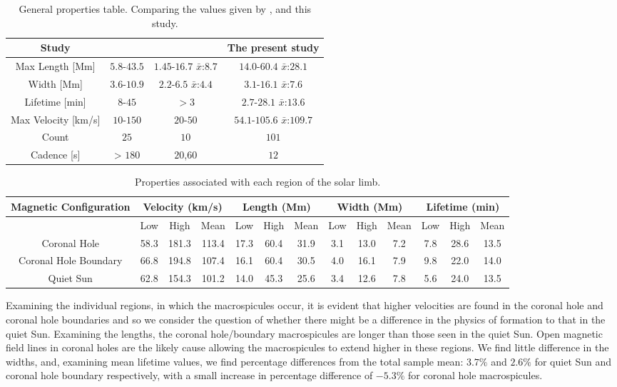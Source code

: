 \begin{table*}[t!]
	\centering
	\begin{tabular}{c c c c}
		\hline\hline
		Study & \cite{Bohlin1975} & \cite{Dere89} & The present study \\    
		\hline                                
		Max Length [Mm] & $5.8$-$43.5$ & $1.45$-$16.7$ $\bar{x}$:$8.7$ & $14.0$-$60.4$ $\bar{x}$:$28.1$ \\
		Width [Mm] & $3.6$-$10.9$ & $2.2$-$6.5$ $\bar{x}$:$4.4$ & $3.1$-$16.1$ $\bar{x}$:$7.6$ \\
		Lifetime [min] & $8$-$45$ & $> 3$ & $2.7$-$28.1$ $\bar{x}$:$13.6$ \\
		Max Velocity [km/s] & $10$-$150$ & $20$-$50$ & $54.1$-$105.6$ $\bar{x}$:$109.7$ \\
		Count & $25$ & $10$ & $101$ \\
		Cadence [s] & > $180$ & $20$,$60$ & $12$ \\
		\hline 
	\end{tabular}
	\caption{General properties table. Comparing the values given by \cite{Bohlin1975}, \cite{Dere89} and this study.}
	\label{table:final properties}
\end{table*}

\begin{table*}[t!]
	\begin{center}
		\begin{tabular}{|c|c|c|c|c|c|c|c|c|c|c|c|c|}
			\hline 
			Magnetic Configuration & \multicolumn{3}{c|}{Velocity (km/s)} & \multicolumn{3}{c|}{Length (Mm)} & \multicolumn{3}{c|}{Width (Mm)} & \multicolumn{3}{c|}{Lifetime (min)}\tabularnewline
			\hline 
			\hline 
			& \multicolumn{1}{c|}{Low} & High & Mean & Low & High & Mean & \multicolumn{1}{c|}{Low} & High & Mean & Low & High & Mean\tabularnewline
			\hline 
			Coronal Hole & 58.3 & 181.3 & 113.4 & 17.3 & 60.4 & 31.9 & 3.1 & 13.0 & 7.2 & 7.8 & 28.6 & 13.5\tabularnewline
			\hline 
			Coronal Hole Boundary & 66.8 & 194.8 & 107.4 & 16.1 & 60.4 & 30.5 & 4.0 & 16.1 & 7.9 & 9.8 & 22.0 & 14.0\tabularnewline
			\hline 
			Quiet Sun & 62.8 & 154.3 & 101.2 & 14.0 & 45.3 & 25.6 & 3.4 & 12.6 & 7.8 & 5.6 & 24.0 & 13.5\tabularnewline
			\hline 
		\end{tabular}
		\caption{Properties associated with each region of the solar limb.}
	\end{center}
\end{table*}


Examining the individual regions, in which the macrospicules occur, it is evident that higher velocities are found in the coronal hole and coronal hole boundaries and so we consider the question of whether there might be a difference in the physics of formation to that in the quiet Sun. Examining the lengths, the coronal hole/boundary macrospicules are longer than those seen in the quiet Sun. Open magnetic field lines in coronal holes are the likely cause allowing the macrospicules to extend higher in these regions. We find little difference in the widths, and, examining mean lifetime values, we find percentage differences from the total sample mean: $3.7\%$ and $2.6\%$ for quiet Sun and coronal hole boundary respectively, with a small increase in percentage difference of $-5.3\%$ for coronal hole macrospicules.


